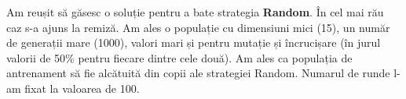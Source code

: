 Am reușit să găsesc o soluție pentru a bate strategia \textbf{Random}. În cel mai rău caz s-a ajuns la remiză. Am ales o populație cu dimensiuni mici (15), un număr de generații mare (1000), valori mari și pentru mutație și încrucișare (în jurul valorii de 50\% pentru fiecare dintre cele două). Am ales ca populația de antrenament să fie alcătuită din copii ale strategiei Random. Numarul de runde l-am fixat la valoarea de 100.






































































































